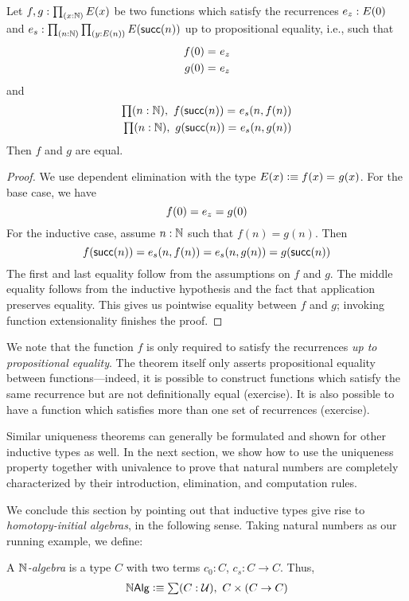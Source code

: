 \begin{thm}\label{thm:nat-uniq}
Let $f,g : \prd{x:\nat} E(x)$ be two functions which satisfy the recurrences $e_z : E(0)$ and $e_s : \prd{n : \nat}{y : E(n)} E(\s(n))$ up to propositional equality, i.e., such that
\begin{align*}
f(0) =_{} e_z \\ 
g(0) =_{} e_z
\end{align*}
and 
\begin{align*}
\prd{n : \nat} \id{f(\s(n))}{e_s(n, f(n))} \\
\prd{n : \nat} \id{g(\s(n))}{e_s(n, g(n))}
\end{align*}
Then $f$ and $g$ are equal. 
\end{thm}

\begin{proof}
We use dependent elimination with the type $E(x) \vcentcolon\equiv f(x) =_{} g(x)$. For the base case, we have \[f(0) = e_z = g(0)\]
For the inductive case, assume $n : \mathbb{N}$ such that $f(n) = g(n)$. Then
\[ f(\mathsf{succ}(n)) = e_s(n, f(n)) = e_s(n, g(n)) = g(\mathsf{succ}(n)) \]
The first and last equality follow from the assumptions on $f$ and $g$. The middle equality follows from the inductive hypothesis and the fact that application preserves equality. This gives us pointwise equality between $f$ and $g$; invoking function extensionality finishes the proof.
\end{proof}
We note that the function $f$ is only required to satisfy the recurrences \emph{up to propositional equality}. The theorem itself only asserts propositional equality between functions---indeed, it is possible to construct functions which satisfy the same recurrence but are not definitionally equal (exercise). It is also possible to have a function which satisfies more than one set of recurrences (exercise).

Similar uniqueness theorems can generally be formulated and shown for other inductive types as well. In the next section, we show how to use the uniqueness property together with univalence to prove that natural numbers are completely characterized by their introduction, elimination, and computation rules.

\medskip

We conclude this section by pointing out that inductive types give rise to \emph{homotopy-initial algebras}, in the following sense. Taking natural numbers as our running example, we define:

\begin{defn}
A \emph{$\mathbb{N}$-algebra} is a type $C$ with two terms $c_0 : C$, $c_s : C \to C$. Thus,
\begin{align*}
\nalg \defeq \sm {C : \type} C \times (C \to C)
\end{align*}
\end{defn}

